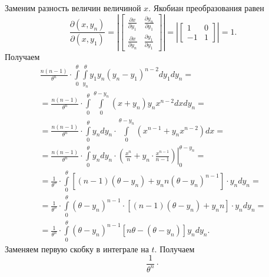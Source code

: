 \begin{enumerate}[label=\alph*)]
Заменим разность величин величиной $x$.
Якобиан преобразования равен
$$ \frac{ \partial \left( x, y_n \right) }{ \partial \left( x, y_1 \right) } =
  \left|
    \begin{bmatrix}
      \frac{ \partial x}{ \partial y_1} & \frac{ \partial y_n}{ \partial y_1} \\
      \frac{ \partial x}{ \partial y_n} & \frac{ \partial y_1}{ \partial y_1}
    \end{bmatrix}
  \right| =
  \left|
    \begin{bmatrix}
      1 & 0 \\
      -1 & 1
    \end{bmatrix}
  \right| =
  1.$$
Получаем
\begin{equation*}
  \begin{split}
    \frac{n \left( n - 1 \right) }{ \theta^n} \cdot
    \int \limits_0^{ \theta }
      \int \limits_{y_n}^{ \theta } y_1 y_n \left( y_n - y_1 \right)^{n - 2} dy_1
    dy_n = \\
    = \frac{n \left( n - 1 \right) }{ \theta^n} \cdot
    \int \limits_0^{ \theta }
      \int \limits_0^{ \theta - y_n} \left( x + y_n \right) y_n x^{n - 2} dx
    dy_n = \\
    = \frac{n \left( n - 1 \right) }{ \theta^n} \cdot
    \int \limits_0^{ \theta } y_n dy_n \cdot
      \int \limits_0^{ \theta - y_n} \left( x^{n - 1} + y_n x^{n - 2} \right) dx = \\
    = \frac{n \left( n - 1 \right) }{ \theta^n} \cdot
    \int \limits_0^{ \theta } y_n dy_n \cdot
      \left.
        \left( \frac{x^n}{n} + y_n \cdot \frac{x^{n - 1}}{n - 1} \right)
      \right|_0^{ \theta - y_n} = \\
    = \frac{1}{ \theta^n}  \cdot
    \int \limits_0^{ \theta }
      \left[
        \left( n - 1 \right) \left( \theta - y_n \right) + y_n n \left( \theta - y_n \right)^{n - 1}
      \right] \cdot
      y_n
    dy_n = \\
    = \frac{1}{ \theta^n} \cdot
    \int \limits_0^{ \theta }
      \left( \theta - y_n \right)^{n - 1} \cdot
      \left[ \left( n - 1 \right) \left( \theta - y_n \right) + y_n n \right] \cdot
      y_n
    dy_n = \\
    = \frac{1}{ \theta^n} \cdot
    \int \limits_0^{ \theta }
      \left( \theta - y_n \right)^{n - 1} \left[ n \theta - \left( \theta - y_n \right) \right] y_n
    dy_n.
  \end{split}
\end{equation*}
Заменяем первую скобку в интеграле на $t$.
Получаем
$$ \frac{1}{ \theta^n} \cdot
$$
\end{enumerate}

